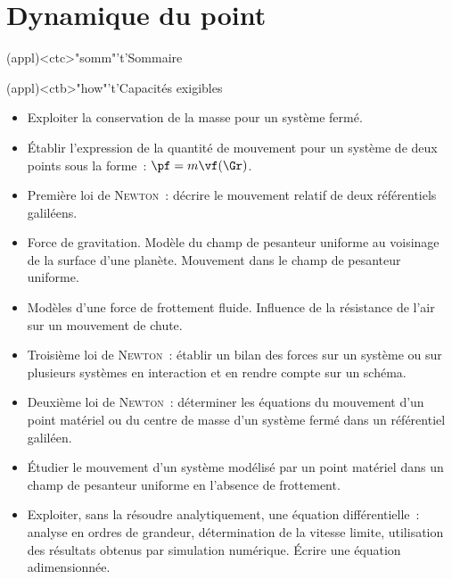 \documentclass[../../main/main.tex]{subfiles}
\begin{document}
\setcounter{chapter}{1}


\chapter{Dynamique du point}

\vspace*{\fill}

\begin{tcn}(appl)<ctc>"somm"'t'{Sommaire}
	\let\item\olditem
	\vspace{-15pt}
	\minitoc
	\vspace{-25pt}
\end{tcn}

\begin{tcn}[sidebyside]
	(appl)<ctb>"how"'t'{Capacités exigibles}
	\begin{itemize}[label=\rcheck]
		\item Exploiter la conservation de la masse pour un système fermé.
		\item Établir l’expression de la quantité de mouvement pour un système de
		      deux points sous la forme~: $\pf=m\vf(\Gr)$.
		\item Première loi de \textsc{Newton}~: décrire le mouvement relatif de
		      deux référentiels galiléens.
		\item Force de gravitation. Modèle du champ de pesanteur uniforme au
		      voisinage de la surface d’une planète. Mouvement dans le champ de
		      pesanteur uniforme.
		\item Modèles d’une force de frottement fluide. Influence de la résistance
		      de l’air sur un mouvement de chute.
	\end{itemize}
	\tcblower
	\begin{itemize}[label=\rcheck]
		\item Troisième loi de \textsc{Newton}~: établir un bilan des forces sur
		      un système ou sur plusieurs systèmes en interaction et en rendre
		      compte sur un schéma.
		\item Deuxième loi de \textsc{Newton}~: déterminer les équations du
		      mouvement d’un point matériel ou du centre de masse d’un système
		      fermé dans un référentiel galiléen.
		\item Étudier le mouvement d’un système modélisé par un point matériel
		      dans un champ de pesanteur uniforme en l’absence de frottement.
		\item Exploiter, sans la résoudre analytiquement, une équation
		      différentielle~: analyse en ordres de grandeur, détermination de la
		      vitesse limite, utilisation des résultats obtenus par simulation
		      numérique. Écrire une équation adimensionnée.
	\end{itemize}
\end{tcn}
\end{document}
